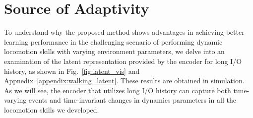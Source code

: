 \section{Source of Adaptivity}\label{subsec:adaptivity}
To understand why the proposed method shows advantages in achieving better learning performance in the challenging scenario of performing dynamic locomotion skills with varying environment parameters, we delve into an examination of the latent representation provided by the encoder for long I/O history, as shown in Fig.~\ref{fig:latent_vis} and Appnedix~\ref{appendix:walking_latent}.
These results are obtained in simulation. 
As we will see, the encoder that utilizes long I/O history can capture both time-varying events and time-invariant changes in dynamics parameters in all the locomotion skills we developed. 



